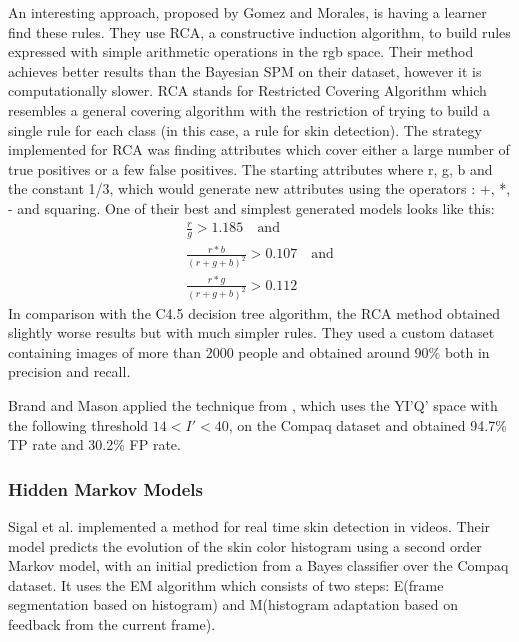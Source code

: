 \documentclass[12pt]{report}
\begin{document}
 	An interesting approach, proposed by Gomez and Morales\cite{rca_threshold}, is having a learner find these rules. They use RCA, a constructive induction algorithm, to build rules expressed with simple arithmetic operations in the rgb space. Their method achieves better results than the Bayesian SPM on their dataset, however it is computationally slower. RCA stands for Restricted Covering Algorithm which resembles a general covering algorithm with the restriction of trying to build a single rule for each class (in this case, a rule for skin detection). The strategy implemented for RCA was finding attributes which cover either a large number of true positives or a few false positives. The starting attributes where r, g, b and the constant 1/3, which would generate new attributes using the operators : +, *, - and squaring. One of their best and simplest generated models looks like this:
 	\begin{equation}
 	\begin{split}
 	\frac{r}{g} > 1.185 \quad \textrm{and}\\
 	\frac{r * b}{(r + g + b)^2} > 0.107 \quad \textrm{and}\\
 	\frac{r * g}{(r + g + b)^2} > 0.112
 	\end{split}
 	\end{equation}
 	In comparison with the C4.5 decision tree algorithm, the RCA method obtained slightly worse results but with much simpler rules. They used a custom dataset containing images of more than 2000 people and obtained around 90\% both in precision and recall.
 	
 	Brand and Mason \cite{i_threshold_applied} applied the technique from \cite{i_threshold}, which uses the YI'Q' space with the following threshold \(14 < I' < 40\), on the Compaq dataset and obtained 94.7\% TP rate and 30.2\% FP rate.
 	
 	\subsubsection{Hidden Markov Models}
 	Sigal et al.\cite{hmm} implemented a method for real time skin detection in videos. Their model predicts the evolution of the skin color histogram using a second order Markov model, with an initial prediction from a Bayes classifier over the Compaq dataset. It uses the EM algorithm which consists of two steps: E(frame segmentation based on histogram) and M(histogram adaptation based on feedback from the current frame).
 	
\end{document}
